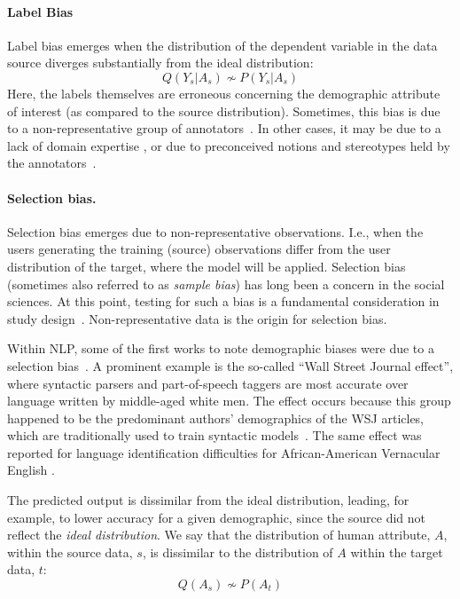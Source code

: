 \documentclass[11pt,a4paper]{article}
\begin{document}
\paragraph{Label Bias}
Label bias emerges when the distribution of the dependent variable in the data source diverges substantially from the ideal distribution: 
$$Q(Y_s|A_s) \nsim P(Y_s|A_s)$$
Here, the labels themselves are erroneous concerning the demographic attribute of interest (as compared to the source distribution). 
Sometimes, this bias is due to a non-representative group of annotators~\cite{joseph2017constance}. In other cases, it may be due to a lack of domain expertise \cite{plank2014learning}, or due to preconceived notions and stereotypes held by the annotators~\cite{sap-etal-2019-risk}.  


\paragraph{Selection bias.} Selection bias emerges due to non-representative observations. I.e., when the users generating the training (source) observations differ from the user distribution of the target, where the model will be applied. Selection bias (sometimes also referred to as \textit{sample bias}) has long been a concern in the social sciences. At this point, testing for such a bias is a fundamental consideration in study design~\cite{berk1983introduction,culotta2014reducing}. Non-representative data is the origin for selection bias. 

Within NLP, some of the first works to note demographic biases were due to a selection bias~\cite{hovy2015tagging,jorgensen2015challenges}. A prominent example is the so-called ``Wall Street Journal effect'', where syntactic parsers and part-of-speech taggers are most accurate over language written by middle-aged white men. The effect occurs because this group happened to be the predominant authors' demographics of the WSJ articles, which are traditionally used to train syntactic models~\cite{garimella-etal-2019-womens}. The same effect was reported for language identification difficulties for African-American Vernacular English \cite{blodgett2017racial,jurgens2017incorporating}.

The predicted output is dissimilar from the ideal distribution, leading, for example, to lower accuracy for a given demographic, since the source did not reflect the \textit{ideal distribution}. 
We say that the distribution of human attribute, $A$, within the source data, $s$, is dissimilar to the distribution of $A$ within the target data, $t$: 
$$Q(A_s) \nsim P(A_t)$$ 
\end{document}
